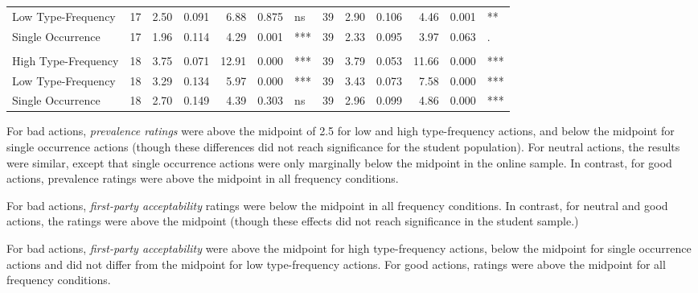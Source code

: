 \documentclass[
]{article}
\begin{document}
\begin{longtable}[t]{lrrrrrlrrrrrl}
\hspace{1em}Low Type-Frequency & 17 & 2.50 & 0.091 & 6.88 & 0.875 & ns & 39 & 2.90 & 0.106 & 4.46 & 0.001 & **\\
\hspace{1em}Single Occurrence & 17 & 1.96 & 0.114 & 4.29 & 0.001 & *** & 39 & 2.33 & 0.095 & 3.97 & 0.063 & .\\
\addlinespace[0.3em]
\multicolumn{13}{l}{\textbf{Prevalence - good}}\\
\hspace{1em}High Type-Frequency & 18 & 3.75 & 0.071 & 12.91 & 0.000 & *** & 39 & 3.79 & 0.053 & 11.66 & 0.000 & ***\\
\hspace{1em}Low Type-Frequency & 18 & 3.29 & 0.134 & 5.97 & 0.000 & *** & 39 & 3.43 & 0.073 & 7.58 & 0.000 & ***\\
\hspace{1em}Single Occurrence & 18 & 2.70 & 0.149 & 4.39 & 0.303 & ns & 39 & 2.96 & 0.099 & 4.86 & 0.000 & ***\\*
\end{longtable}

For bad actions, \emph{prevalence ratings} were above the midpoint of 2.5 for low and high type-frequency actions, and below the midpoint for single occurrence actions (though these differences did not reach significance for the student population). For neutral actions, the results were similar, except that single occurrence actions were only marginally below the midpoint in the online sample. In contrast, for good actions, prevalence ratings were above the midpoint in all frequency conditions.

For bad actions, \emph{first-party acceptability} ratings were below the midpoint in all frequency conditions. In contrast, for neutral and good actions, the ratings were above the midpoint (though these effects did not reach significance in the student sample.)

For bad actions, \emph{first-party acceptability} were above the midpoint for high type-frequency actions, below the midpoint for single occurrence actions and did not differ from the midpoint for low type-frequency actions. For good actions, ratings were above the midpoint for all frequency conditions.
\end{document}
